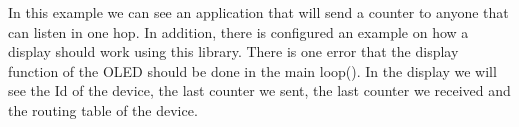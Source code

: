 In this example we can see an application that will send a counter to anyone that can listen in one hop. In addition, there is configured an example on how a display should work using this library. There is one error that the display function of the OLED should be done in the main loop(). In the display we will see the Id of the device, the last counter we sent, the last counter we received and the routing table of the device. 
